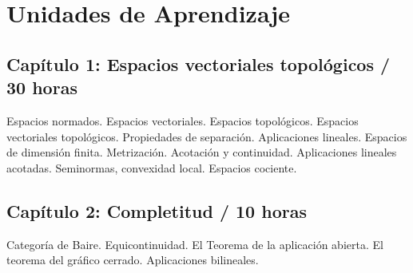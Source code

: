 



\section{Unidades de Aprendizaje}

\subsection*{Capítulo 1: Espacios vectoriales topológicos / 30 horas}

Espacios normados.
Espacios vectoriales.
Espacios topológicos.
Espacios vectoriales topológicos.
Propiedades de separación.
Aplicaciones lineales.
Espacios de dimensión finita.
Metrización.
Acotación y continuidad.
Aplicaciones lineales acotadas.
Seminormas, convexidad local.
Espacios cociente.

\subsection*{Capítulo 2: Completitud / 10 horas}

Categoría de Baire.
Equicontinuidad.
El Teorema de la aplicación abierta.
El teorema del gráfico cerrado.
Aplicaciones bilineales.

